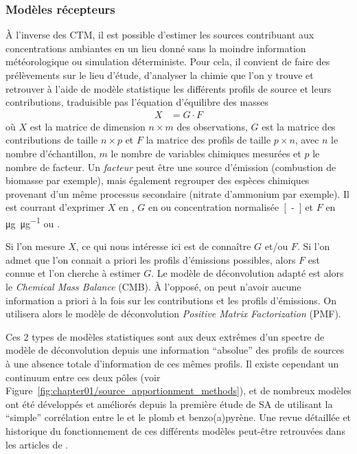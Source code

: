 \subsubsection{Modèles récepteurs}%
\label{ssub:model_recepteur}

À l'inverse des CTM, il est possible d'estimer les sources contribuant aux concentrations
ambiantes en un lieu donné sans la moindre information météorologique ou simulation
déterministe. Pour cela, il convient de faire des prélèvements sur le lieu d'étude,
d'analyser la chimie que l'on y trouve et retrouver à l'aide de modèle statistique
les différents profils de source et leurs contributions, traduisible pas l'équation
d'équilibre des masses
\begin{align}
    \label{eq:mass_balance}
    X &= G \cdot F
\end{align}
où $X$ est la matrice de dimension $n\times m$ des observations, $G$ est la matrice des
contributions de taille $n\times p$ et $F$ la matrice des profils de taille $p \times n$,
avec $n$ le nombre d'échantillon, $m$ le nombre de variables chimiques mesurées et $p$ le
nombre de facteur.
Un \textit{facteur} peut être une source d'émission (combustion de biomasse par exemple),
mais également regrouper des espèces chimiques provenant d'un même processus secondaire
(nitrate d'ammonium par exemple).
Il est courrant d'exprimer $X$ en \si{\ugm}, $G$ en \si{\ugm} ou concentration
normalisée~\si{[-]} et $F$ en \si{\micro\g\per\micro\g} ou \si{\ugm}.

Si l'on mesure $X$, ce qui nous intéresse ici est de connaître $G$ et/ou $F$.
Si l'on admet que l'on connait a priori les profils d'émissions possibles, alors $F$ est
connue et l'on cherche à estimer $G$. Le modèle de déconvolution adapté est alors le
\textit{Chemical Mass Balance} (CMB). À l'opposé, on peut n'avoir aucune information a
priori à la fois sur les contributions et les profils d'émissions. On utilisera alors le
modèle de déconvolution \textit{Positive Matrix Factorization} (PMF).

Ces 2 types de modèles statistiques sont aux deux extrêmes d'un spectre de modèle de
déconvolution depuis une information ``absolue'' des profils de sources à une absence
totale d'information de ces mêmes profils.  Il existe cependant un continuum entre ces
deux pôles (voir Figure~\ref{fig:chapter01/source_apportionment_methods}), et de nombreux
modèles ont été développés et améliorés depuis la première étude de SA de
\textcite{colucciAutomotive1965} utilisant la ``simple'' corrélation entre le  et
le plomb et benzo(a)pyrène.  Une revue détaillée et historique du fonctionnement de ces
différents modèles peut-être retrouvées dans les articles de
\textcite{henryHistory1997,vianaSource2008,belisCritical2013,hopkeReview2016}.

